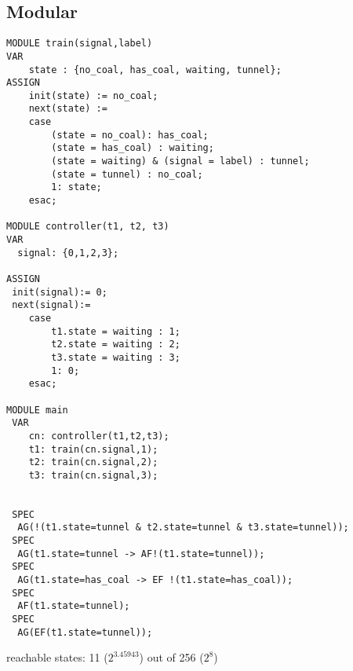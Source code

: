 \documentclass[a4paper]{article}
\begin{document}
\subsection*{Modular}
\begin{verbatim}
MODULE train(signal,label)
VAR 
	state : {no_coal, has_coal, waiting, tunnel};
ASSIGN
 	init(state) := no_coal;
 	next(state) := 
 	case
 		(state = no_coal): has_coal;
 		(state = has_coal) : waiting;
 		(state = waiting) & (signal = label) : tunnel;
 		(state = tunnel) : no_coal;
 		1: state;
 	esac;

MODULE controller(t1, t2, t3)
VAR
  signal: {0,1,2,3};

ASSIGN
 init(signal):= 0;
 next(signal):=
	case
		t1.state = waiting : 1;
		t2.state = waiting : 2;
		t3.state = waiting : 3;
		1: 0;
	esac;

MODULE main 
 VAR
  	cn: controller(t1,t2,t3);
	t1: train(cn.signal,1);
 	t2: train(cn.signal,2);
 	t3: train(cn.signal,3);


 SPEC
  AG(!(t1.state=tunnel & t2.state=tunnel & t3.state=tunnel));
 SPEC
  AG(t1.state=tunnel -> AF!(t1.state=tunnel));
 SPEC
  AG(t1.state=has_coal -> EF !(t1.state=has_coal));
 SPEC
  AF(t1.state=tunnel);
 SPEC
  AG(EF(t1.state=tunnel));
\end{verbatim}
reachable states: 11 ($2^{3.45943}$) out of 256 ($2^8$)
\end{document}
